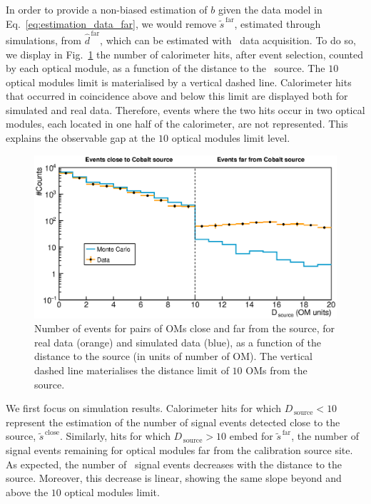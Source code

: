 In order to provide a non-biased estimation of $b$ given the data model in Eq.~\eqref{eq:estimation_data_far}, we would remove $\tilde{s}^{\,\text{far}}$, estimated through simulations, from $\hat{d}^{\,\text{far}}$, which can be estimated with \Co\ data acquisition.
To do so, we display in Fig.~\ref{fig:Co_data_bkg} the number of calorimeter hits, after event selection, counted by each optical module, as a function of the distance to the \Co\ source.
The $10$ optical modules limit is materialised by a vertical dashed line.
Calorimeter hits that occurred in coincidence above and below this limit are displayed both for simulated and real data.
Therefore, events where the two hits occur in two optical modules, each located in one half of the calorimeter, are not represented.
This explains the observable gap at the $10$ optical modules limit level.
\begin{figure}[h]
  \centering
  \includegraphics[width=1.1\textwidth]{commissioning/fig_commissioning/Co_data_bkg.eps}
  \caption{Number of events for pairs of OMs close and far from the source, for real data (orange) and simulated data (blue), as a function of the distance to the source (in units of number of OM).
    The vertical dashed line materialises the distance limit of $10$ OMs from the source.
    \label{fig:Co_data_bkg}}
\end{figure}

We first focus on simulation results.
Calorimeter hits for which $D_{\,\text{source}}<10$ represent the estimation of the number of signal events detected close to the source, $\tilde{s}^{\,\text{close}}$.
Similarly, hits for which $D_{\,\text{source}}>10$ embed for $\tilde{s}^{\,\text{far}}$, the number of signal events remaining for optical modules far from the calibration source site.
As expected, the number of \Co\ signal events decreases with the distance to the source.
Moreover, this decrease is linear, showing the same slope beyond and above the $10$ optical modules limit.

